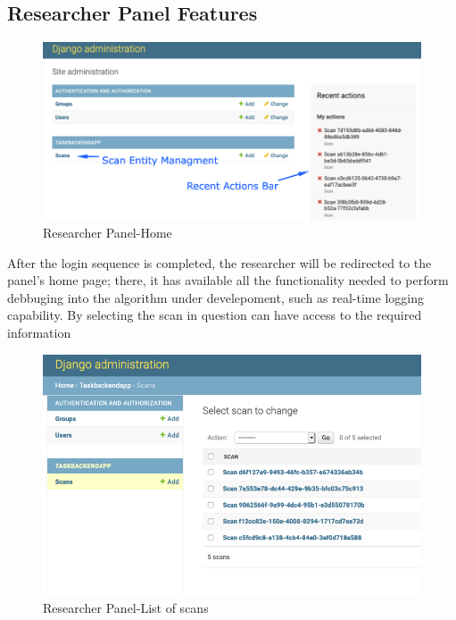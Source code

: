 		\subsection{Researcher Panel Features}
			\begin{figure}[H]
				\iftrue
				\caption{Researcher Panel-Home}
				\centering
				\includegraphics[scale=0.3]{figures/research-panel-home}
				\fi
			\end{figure}
			After the login sequence is completed, the researcher will be redirected to the panel's home page; there, 
			it has available all the functionality needed to perform debbuging into the algorithm under develepoment, such as 
			real-time logging capability. By selecting the scan in question can have access to the required information
			\begin{figure}[H]
				\iftrue
				\caption{Researcher Panel-List of scans}
				\centering
				\includegraphics[scale=0.3]{figures/research-panel-scan-list}
				\fi
			\end{figure}
